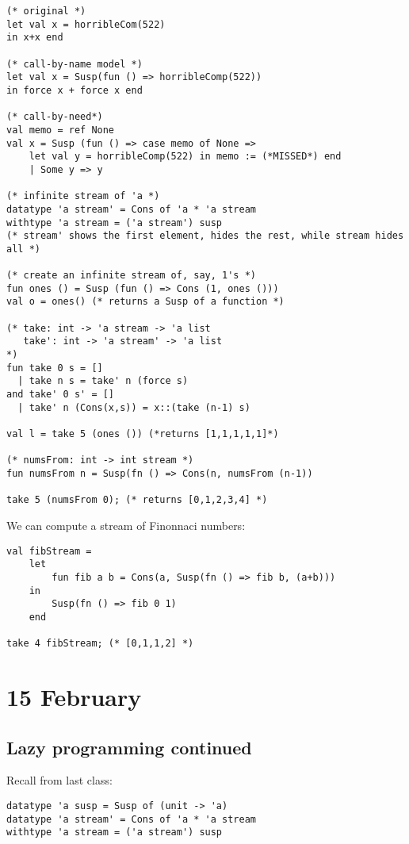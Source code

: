 \documentclass[11pt]{article}
\begin{document}
\begin{verbatim}
(* original *)
let val x = horribleCom(522)
in x+x end

(* call-by-name model *)
let val x = Susp(fun () => horribleComp(522))
in force x + force x end

(* call-by-need*)
val memo = ref None
val x = Susp (fun () => case memo of None =>
    let val y = horribleComp(522) in memo := (*MISSED*) end
    | Some y => y

(* infinite stream of 'a *)
datatype 'a stream' = Cons of 'a * 'a stream
withtype 'a stream = ('a stream') susp
(* stream' shows the first element, hides the rest, while stream hides all *)

(* create an infinite stream of, say, 1's *)
fun ones () = Susp (fun () => Cons (1, ones ()))
val o = ones() (* returns a Susp of a function *)

(* take: int -> 'a stream -> 'a list
   take': int -> 'a stream' -> 'a list
*)
fun take 0 s = []
  | take n s = take' n (force s)
and take' 0 s' = []
  | take' n (Cons(x,s)) = x::(take (n-1) s)

val l = take 5 (ones ()) (*returns [1,1,1,1,1]*)

(* numsFrom: int -> int stream *)
fun numsFrom n = Susp(fn () => Cons(n, numsFrom (n-1))

take 5 (numsFrom 0); (* returns [0,1,2,3,4] *)
\end{verbatim}

We can compute a stream of Finonnaci numbers:
\begin{verbatim}
val fibStream =
    let
        fun fib a b = Cons(a, Susp(fn () => fib b, (a+b)))
    in
        Susp(fn () => fib 0 1)
    end

take 4 fibStream; (* [0,1,1,2] *)
\end{verbatim}

\section{15 February}
\subsection{Lazy programming continued}

Recall from last class:

\begin{verbatim}
datatype 'a susp = Susp of (unit -> 'a)
datatype 'a stream' = Cons of 'a * 'a stream
withtype 'a stream = ('a stream') susp
\end{verbatim}
\end{document}
